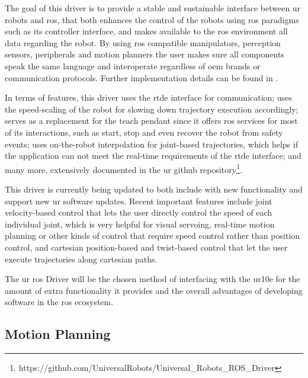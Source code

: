 \par The goal of this driver is to provide a stable and sustainable interface between \ac{ur} robots and \ac{ros}, that both enhances the control of the robots using \ac{ros} paradigms such as its controller interface, and makes available to the \ac{ros} environment all data regarding the robot. By using \ac{ros} compatible manipulators, perception sensors, peripherals and motion planners the user makes sure all components speak the same language and interoperate regardless of \acs{oem} brands or communication protocols. Further implementation details can be found in \cite{ur.ros.driver}.
\par In terms of features, this driver uses the \ac{rtde} interface for communication; uses the speed-scaling of the robot for slowing down trajectory execution accordingly; serves as a replacement for the teach pendant since it offers \ac{ros} services for most of its interactions, such as start, stop and even recover the robot from safety events; uses on-the-robot interpolation for joint-based trajectories, which helps if the application can not meet the real-time requirements of the \ac{rtde} interface; and many more, extensively documented in the \ac{ur} github repository\footnote{https://github.com/UniversalRobots/Universal\_Robots\_ROS\_Driver}.
\par This driver is currently being updated to both include with new functionality and support new \ac{ur} software updates. Recent important features include joint velocity-based control that lets the user directly control the speed of each individual joint, which is very helpful for visual servoing, real-time motion planning or other kinds of control that require speed control rather than position control, and cartesian position-based and twist-based control that let the user execute trajectories along cartesian paths.
\par The \ac{ur} \ac{ros} Driver will be the chosen method of interfacing with the \ac{ur10e} for the amount of extra functionality it provides and the overall advantages of developing software in the \ac{ros} ecosystem.


\subsection{Motion Planning}


